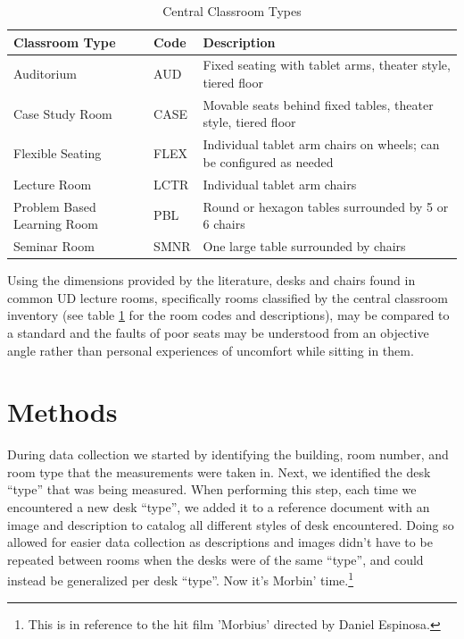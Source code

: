\documentclass[conference]{IEEEtran}
\begin{document}
\begin{table}
    \centering
    \caption{Central Classroom Types}
    \begin{tabular}{@{}llp{8cm}@{}}
    \toprule
    \textbf{Classroom Type} & \textbf{Code} & \textbf{Description} \\
    \midrule
    Auditorium & AUD & Fixed seating with tablet arms, theater style, tiered floor \\
    Case Study Room & CASE & Movable seats behind fixed tables, theater style, tiered floor \\
    Flexible Seating & FLEX & Individual tablet arm chairs on wheels;  can be configured as needed \\
    Lecture Room & LCTR & Individual tablet arm chairs \\
    Problem Based Learning Room & PBL & Round or hexagon tables surrounded by 5 or 6 chairs \\
    Seminar Room & SMNR & One large table surrounded by chairs \\
    \bottomrule
    \end{tabular}
    \label{tab:roomcodes}
\end{table}


Using the dimensions provided by the literature, desks and chairs found in common UD lecture rooms, specifically rooms classified by the central classroom inventory (see table \ref*{tab:roomcodes} for the room codes and descriptions), may be compared to a standard and the faults of poor seats may be understood from an objective angle rather than personal experiences of uncomfort while sitting in them.




\section{Methods}

During data collection we started by identifying the building, room number, and room type that the measurements were taken in. Next, we identified the desk “type” that was being measured. When performing this step, each time we encountered a new desk “type”, we added it to a reference document with an image and description to catalog all different styles of desk encountered. Doing so allowed for easier data collection as descriptions and images didn't have to be repeated between rooms when the desks were of the same “type”, and could instead be generalized per desk “type”. Now it's Morbin' time.\footnote{This is in reference to the hit film 'Morbius' directed by Daniel Espinosa.}
\end{document}
